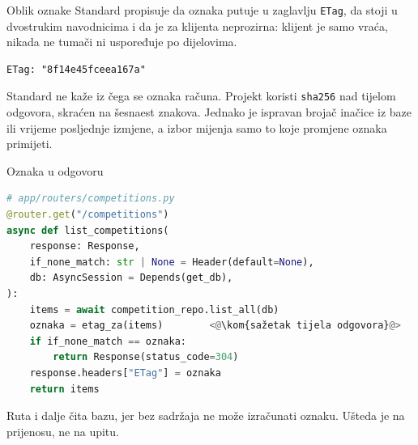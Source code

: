
\begin{frame}[fragile]{Oblik oznake}
Standard propisuje da oznaka putuje u zaglavlju \texttt{ETag}, da stoji u dvostrukim navodnicima i da je za klijenta neprozirna: klijent je samo vraća, nikada ne tumači ni uspoređuje po dijelovima.

\begin{lstlisting}
ETag: "8f14e45fceea167a"
\end{lstlisting}

\begin{konvencija}
Standard ne kaže iz čega se oznaka računa. Projekt koristi \texttt{sha256} nad tijelom odgovora, skraćen na šesnaest znakova. Jednako je ispravan brojač inačice iz baze ili vrijeme posljednje izmjene, a izbor mijenja samo to koje promjene oznaka primijeti.
\end{konvencija}
\end{frame}


\begin{frame}[fragile]{Oznaka u odgovoru}
\vspace{-0.3em}
\begin{lstlisting}[language=python]
# app/routers/competitions.py
@router.get("/competitions")
async def list_competitions(
    response: Response,
    if_none_match: str | None = Header(default=None),
    db: AsyncSession = Depends(get_db),
):
    items = await competition_repo.list_all(db)
    oznaka = etag_za(items)        <@\kom{sažetak tijela odgovora}@>
    if if_none_match == oznaka:
        return Response(status_code=304)
    response.headers["ETag"] = oznaka
    return items
\end{lstlisting}

\vspace{0.2em}
Ruta i dalje čita bazu, jer bez sadržaja ne može izračunati oznaku. Ušteda je na prijenosu, ne na upitu.
\end{frame}

